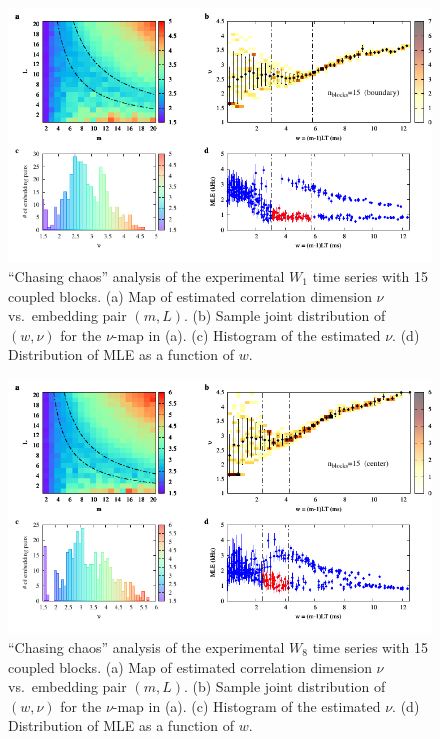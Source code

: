 \begin{appendices}
\begin{figure}[!htbp]
    \centering
    \includegraphics[width=\linewidth]{../blocks/15_blocks/edge/2e5_points/plots/chaos_low.pdf}
    \caption{``Chasing chaos'' analysis of the experimental $W_1$ time series with 15 coupled blocks.
    (a) Map of estimated correlation dimension $\nu$ vs.\ embedding pair $(m, L)$.
    (b) Sample joint distribution of $(w,\nu)$ for the $\nu$-map in (a).
    (c) Histogram of the estimated $\nu$. (d) Distribution of MLE as a function of $w$.
    } 
\end{figure}

\begin{figure}[!htbp]
    \centering
    \includegraphics[width=\linewidth]{../blocks/15_blocks/middle/2e5_points/plots/chaos_low.pdf}
    \caption{``Chasing chaos'' analysis of the experimental $W_8$ time series with 15 coupled blocks.
    (a) Map of estimated correlation dimension $\nu$ vs.\ embedding pair $(m, L)$.
    (b) Sample joint distribution of $(w,\nu)$ for the $\nu$-map in (a).
    (c) Histogram of the estimated $\nu$. (d) Distribution of MLE as a function of $w$.
    } 
\end{figure}


\end{appendices}
